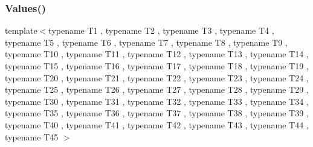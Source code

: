 \mbox{\label{namespacetesting_a227b4b3b251f5f4aa0e1261c27fe9dd4}} 
\subsubsection{\texorpdfstring{Values()}{Values()}\hspace{0.1cm}{\footnotesize\ttfamily [45/50]}}
{\footnotesize\ttfamily template$<$typename T1 , typename T2 , typename T3 , typename T4 , typename T5 , typename T6 , typename T7 , typename T8 , typename T9 , typename T10 , typename T11 , typename T12 , typename T13 , typename T14 , typename T15 , typename T16 , typename T17 , typename T18 , typename T19 , typename T20 , typename T21 , typename T22 , typename T23 , typename T24 , typename T25 , typename T26 , typename T27 , typename T28 , typename T29 , typename T30 , typename T31 , typename T32 , typename T33 , typename T34 , typename T35 , typename T36 , typename T37 , typename T38 , typename T39 , typename T40 , typename T41 , typename T42 , typename T43 , typename T44 , typename T45 $>$ \\
}
